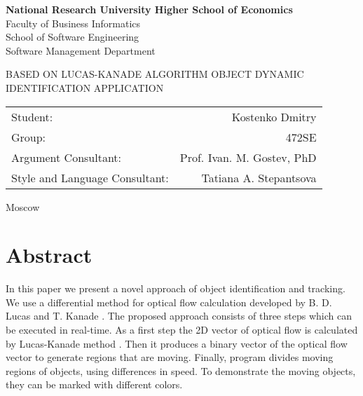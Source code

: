 \documentclass[12pt,a4paper,oneside,titlepage]{article}
\author{Kostenko}
\begin{document}
{
\thispagestyle{empty}
\newpage
\centering

\textbf{
National Research University Higher School of Economics\\
}
Faculty of Business Informatics\\
School of Software Engineering\\
Software Management Department

\vfill


\begin{large}
\MakeTextUppercase{
Based on Lucas-Kanade algorithm Object dynamic identification application
}
\end{large}


\vfill

\begin{tabular}{lr}
Student: & Kostenko Dmitry \\
Group: & 472SE \\
Argument Consultant: & Prof. Ivan. M. Gostev, PhD \\
Style and Language Consultant: & Tatiana A. Stepantsova
\end{tabular}

\vspace{\fill}

Moscow\\ \number\year
\clearpage
}

\section*{Abstract}
{
In this paper we present a novel approach of object identification and tracking.
We use a differential method for optical flow calculation developed by B. D. Lucas and T. Kanade \cite{lucasKanade}.
The proposed approach consists of three steps which can be executed in real-time.
As a first step the 2D vector of optical flow is calculated by Lucas-Kanade method \cite{lucasKanade}.
Then it produces a binary vector of the optical flow vector to generate regions that are moving.  
Finally, program divides moving regions of objects, using differences in speed.
To demonstrate the moving objects, they can be marked with different colors.
}


{
\newpage
\centering
\tableofcontents
}


\newpage
\end{document}
